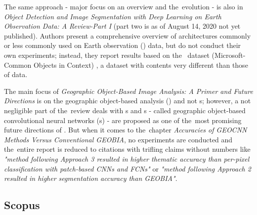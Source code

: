 The same approach - major focus on an overview and the~evolution - is also in \textit{Object Detection and Image Segmentation with Deep Learning on Earth Observation Data: A Review-Part I} (part two is as of August 14, 2020 not yet published). Authors present a comprehensive overview of  architectures commonly or less commonly used on Earth observation () data, but do not conduct their own experiments; instead, they report results based on the~ dataset (Microsoft-Common Objects in Context) \cite{coco}, a dataset with contents very different than those of  data.

The main focus of \textit{Geographic Object-Based Image Analysis: A Primer and Future Directions} is on the geographic object-based analysis () and not s; however, a not negligible part of the~review deals with s and s - called geographic object-based convolutional neural networks (s) - are proposed as one of the~most promising future directions of . But when it comes to the~chapter \textit{Accuracies of GEOCNN Methods Versus Conventional GEOBIA}, no experiments are conducted and the~entire report is reduced to citations with trifling claims without numbers like \textit{"method following Approach 3 resulted in higher thematic accuracy than per-pixel classification with patch-based CNNs and FCNs"} or \textit{"method following Approach 2 resulted in higher segmentation accuracy than GEOBIA"}.

\subsection{Scopus}
\label{scopus-reviews}
